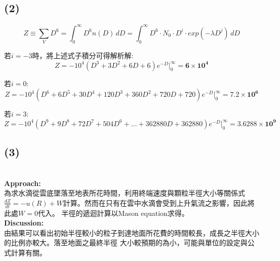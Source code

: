 \documentclass{article}
\begin{document}
\begin{CJK*}{UTF8}{bsmi}
\subsection*{(2)}
    \begin{large}
        \begin{center}
            \begin{displaymath}
                Z \equiv \sum\limits_{V}D^6 = \int_{0}^{\infty} D^6n(D) \,dD = \int_{0}^{\infty} D^6 \cdot N_0 \cdot D^i \cdot exp(-\lambda D^j) \,dD
            \end{displaymath}
        \end{center}

        \bigskip

        若$i = -3$時，將上述式子積分可得解析解:
            \begin{displaymath}
                Z = -10^4(D^3 + 3D^2 + 6D + 6)e^{-D}\bigg|^{\infty}_{0} = \mathbf{6 \times 10^4}
            \end{displaymath}

        \newpage

        若$i = 0$:
        \begin{displaymath}
            Z = -10^4(D^6 + 6D^5 + 30D^4 + 120D^3 + 360D^2 + 720D +720)e^{-D}\bigg|^{\infty}_{0} = \mathbf{7.2 \times 10^6}
        \end{displaymath}

        若$i = 3$:
        \begin{displaymath}
            Z = -10^4(D^9 + 9D^8 + 72D^7 + 504D^6 + \dots + 362880D + 362880)e^{-D}\bigg|^{\infty}_{0} = \mathbf{3.6288 \times 10^9}
        \end{displaymath}

    \end{large}

\subsection*{(3)}
    \begin{large}
        
    
    \end{large}


\begin{spacing}{2}
    \begin{large}
        \: \\
        \textbf{Approach:} \\
        為求水滴從雲底墜落至地表所花時間，利用終端速度與顆粒半徑大小等關係式\\
        $\frac{dZ}{dt} = -u(R) + W$計算。然而在只有在雲中水滴會受到上升氣流之影響，因此將此處$W = 0$代入。
        半徑的遞迴計算以Mason equation求得。\\
        \textbf{Discussion:} \\
        由結果可以看出初始半徑較小的粒子到達地面所花費的時間較長，成長之半徑大小的比例亦較大。落至地面之最終半徑
        大小較預期的為小，可能與單位的設定與公式計算有關。


\end{large}
\end{spacing}
\end{CJK*}
\end{document}

